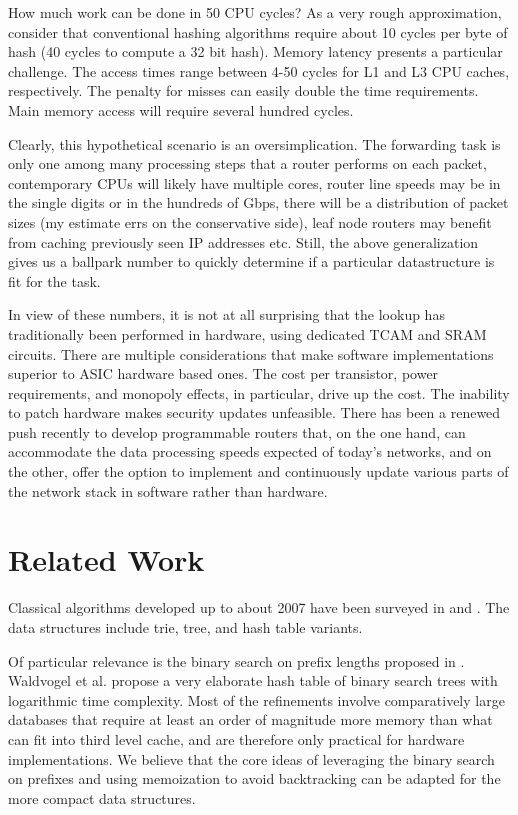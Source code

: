 \documentclass[conference,compsoc]{IEEEtran}
\begin{document}
How much work can be done in 50 CPU cycles? As a very rough approximation,
consider that conventional hashing algorithms require about 10 cycles 
per byte of hash (40 cycles to compute a 32 bit hash). Memory latency
presents a particular challenge. The access times range between 4-50 cycles
for L1 and L3 CPU caches, respectively. The penalty for misses can easily 
double the time requirements. Main memory access will require several hundred 
cycles.

Clearly, this hypothetical scenario is an oversimplication. The forwarding
task is only one among many processing steps that a router performs on each
packet, contemporary CPUs will likely have multiple cores, router line
speeds may be in the single digits or in the hundreds of Gbps, there will 
be a distribution of packet sizes (my estimate errs on the conservative
side), leaf node routers may benefit from caching previously seen IP
addresses etc. Still, the above generalization gives us a ballpark number 
to quickly determine if a particular datastructure is fit for the task.

In view of these numbers, it is not at all surprising that the lookup has 
traditionally been performed in hardware, using dedicated TCAM and SRAM 
circuits. There are multiple considerations that make software 
implementations superior to ASIC hardware based ones. The cost per 
transistor, power requirements, and monopoly effects, in particular, 
drive up the cost. The inability to patch hardware makes security updates
unfeasible. There has been a renewed push recently to develop 
programmable routers that, on the one hand, can accommodate the data 
processing speeds expected of today's networks, and on the other, offer 
the option to implement and continuously update various parts of the 
network stack in software rather than hardware.


\section{Related Work}
Classical algorithms developed up to about 2007 have been surveyed in
\cite{Sanchez:Survey} and \cite{Varghese:Algorithmics}. 
The data structures include trie, tree, and hash table variants.

Of particular relevance is the binary search on prefix lengths
proposed in \cite{Waldvogel:Scalable}. Waldvogel et al. propose a very 
elaborate hash table of binary search trees with logarithmic time 
complexity. Most
of the refinements involve comparatively large databases that require at
least an order of magnitude more memory than what can fit into third level
cache, and are therefore only practical for hardware implementations. We
believe that the core ideas of leveraging the binary search on prefixes and 
using memoization to avoid backtracking can be adapted for the more 
compact data structures.
\end{document}
